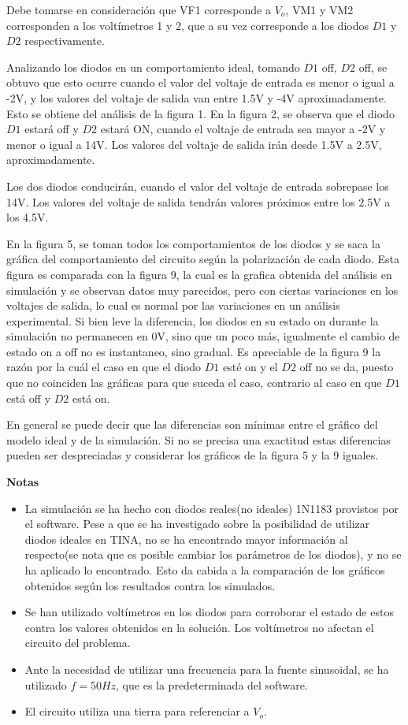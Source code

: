 Debe tomarse en consideración que VF1 corresponde a $V_o$, VM1 y VM2
corresponden a los voltímetros 1 y 2, que a su vez corresponde a los diodos
$D1$ y $D2$ respectivamente.

Analizando los diodos en un comportamiento ideal, tomando $D1$ off, $D2$ off, se
obtuvo que esto ocurre cuando el valor del voltaje de entrada es menor o igual
a -2V, y los valores del voltaje de salida van entre 1.5V y -4V aproximadamente.
Esto se obtiene del análisis de la figura 1.
En la figura 2, se observa que el diodo $D1$ estará off y $D2$ estará ON, cuando
el voltaje de entrada sea mayor a -2V y menor o igual a 14V. Los valores del
voltaje de salida irán desde 1.5V a 2.5V, aproximadamente.

Los dos diodos conducirán, cuando el valor del voltaje de entrada sobrepase los
14V. Los valores del voltaje de salida tendrán valores próximos entre los 2.5V
a los 4.5V.

En la figura 5, se toman todos los comportamientos de los diodos y se saca la
gráfica del comportamiento del circuito según la polarización de cada diodo.
Esta figura es comparada con la figura 9, la cual es la grafica obtenida del
análisis en simulación y se observan datos muy parecidos, pero con ciertas
variaciones en los voltajes de salida, lo cual es normal por las variaciones en
un análisis experimental. Si bien leve la diferencia, los diodos en su estado on
durante la simulación no permanecen en 0V, sino que un poco más, igualmente el
cambio de estado on a off no es instantaneo, sino gradual. Es apreciable de la
figura 9 la razón por la cuál el caso en que el diodo $D1$ esté on y el $D2$ off
no se da, puesto que no coinciden las gráficas para que suceda el caso,
contrario al caso en que $D1$ está off y $D2$ está on.

En general se puede decir que las diferencias son mínimas entre el gráfico del
modelo ideal y de la simulación. Si no se precisa una exactitud estas
diferencias pueden ser despreciadas y considerar los gráficos de la figura
5 y la 9 iguales.

\bigskip

\textbf{Notas}
\begin{itemize}
  \item La simulación se ha hecho con diodos reales(no ideales) 1N1183 provistos
  por el software. Pese a que se ha investigado sobre la posibilidad de utilizar
  diodos ideales en TINA, no se ha encontrado mayor información al respecto(se
  nota que es posible cambiar los parámetros de los diodos), y no se ha aplicado
  lo encontrado. Esto da cabida a la comparación de los gráficos obtenidos según
  los resultados contra los simulados.
  \item Se han utilizado voltímetros en los diodos para corroborar el estado de
  estos contra los valores obtenidos en la solución. Los voltímetros no afectan
  el circuito del problema.
  \item Ante la necesidad de utilizar una frecuencia para la fuente sinusoidal,
  se ha utilizado $f = 50Hz$, que es la predeterminada del software.
  \item El circuito utiliza una tierra para referenciar a $V_o$.
\end{itemize}
